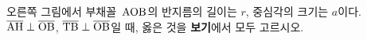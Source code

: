 \noindent\begin{minipage}[t]{0.58\linewidth}\vspace{0pt}\raggedright 오른쪽 그림에서 부채꼴~$\mathrm{AOB}$의 반지름의 길이는 $r$, 중심각의 크기는 $a$이다. $\overline{\mathrm{AH}}\perp\overline{\mathrm{OB}}$, $\overline{\mathrm{TB}}\perp\overline{\mathrm{OB}}$일 때, 옳은 것을 \textbf{보기}에서 모두 고르시오. \end{minipage}\hfill\begin{minipage}[t]{0.4\linewidth}\vspace{0pt}\centering \resizebox{\ifdim\width>\linewidth\linewidth\else\width\fi}{!}{}\end{minipage}\par
\noindent {}
